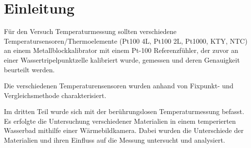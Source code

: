 \section{Einleitung}

Für den Versuch Temperaturmessung sollten verschiedene Temperatursensoren/Thermoelemente (Pt100 4L, Pt100 2L, Pt1000, KTY, NTC) an einem Metallblockkalibrator mit einem Pt-100 Referenzfühler, der zuvor an einer Wassertripelpunktzelle kalibriert wurde,  gemessen und deren Genauigkeit beurteilt werden. 

Die verschiedenen Temperaturensensoren wurden anhand von Fixpunkt- und Vergleichsmethode charakterisiert. 

Im dritten Teil wurde sich mit der berührungslosen Temperaturmessung befasst. Es erfolgte die Untersuchung verschiedener Materialien in einem temperierten Wasserbad mithilfe einer Wärmebildkamera. Dabei wurden die Unterschiede der Materialien und ihren Einfluss auf die Messung untersucht und analysiert. 